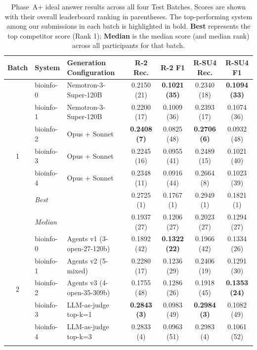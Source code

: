 \begin{table}[ht]
  \centering
  \caption{Phase~A+ ideal answer results across all four Test Batches. Scores are shown with their overall leaderboard ranking in parentheses. The top-performing system among our submissions in each batch is highlighted in bold. \textbf{Best} represents the top competitor score (Rank 1); \textbf{Median} is the median score (and median rank) across all participants for that batch.}
  \label{tab:phaseap-ideal-all}
  \footnotesize
  \begin{tabular}{cl|l|cccc}
    \toprule
    \textbf{Batch} & \textbf{System} & \textbf{Generation Configuration} & \textbf{R-2 Rec.} & \textbf{R-2 F1} & \textbf{R-SU4 Rec.} & \textbf{R-SU4 F1} \\
    \midrule
    \multirow{7}{*}{1}
    & bioinfo-0 & Nemotron-3-Super-120B & 0.2150 (21) & \textbf{0.1021 (35)} & 0.2340 (18) & \textbf{0.1094 (33)} \\
    & bioinfo-1 & Nemotron-3-Super-120B & 0.2200 (17) & 0.1009 (36) & 0.2393 (17) & 0.1074 (36) \\
    & bioinfo-2 & Opus + Sonnet & \textbf{0.2408 (7)} & 0.0825 (48) & \textbf{0.2706 (6)} & 0.0932 (48) \\
    & bioinfo-3 & Opus + Sonnet & 0.2245 (16) & 0.0955 (41) & 0.2489 (15) & 0.1021 (40) \\
    & bioinfo-4 & Opus + Sonnet & 0.2348 (11) & 0.0916 (44) & 0.2664 (8) & 0.1023 (39) \\
    \cmidrule(l){2-7}
    & \textit{Best} & \multicolumn{1}{l|}{} & 0.2725 (1) & 0.1767 (1) & 0.2949 (1) & 0.1821 (1) \\
    & \textit{Median}& \multicolumn{1}{l|}{} & 0.1937 (27) & 0.1206 (27) & 0.2023 (27) & 0.1294 (27) \\
    \midrule
    \multirow{7}{*}{2}
    & bioinfo-0 & Agents v1 (3-open-27-120b) & 0.1892 (42) & \textbf{0.1322 (22)} & 0.1966 (42) & 0.1334 (26) \\
    & bioinfo-1 & Agents v2 (5-mixed) & 0.2280 (17) & 0.1236 (29) & 0.2406 (19) & 0.1291 (30) \\
    & bioinfo-2 & Agents v3 (4-open-35-309b) & 0.1755 (48) & 0.1286 (26) & 0.1918 (45) & \textbf{0.1353 (24)} \\
    & bioinfo-3 & LLM-as-judge top-k=1 & \textbf{0.2843 (3)} & 0.0983 (49) & \textbf{0.2984 (3)} & 0.1082 (49) \\
    & bioinfo-4 & LLM-as-judge top-k=3 & 0.2833 (4) & 0.0963 (51) & 0.2983 (4) & 0.1061 (52) \\
    \cmidrule(l){2-7}

\end{tabular}
\end{table}
